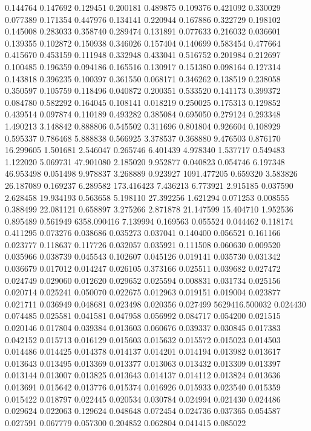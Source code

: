 0.144764
0.147692
0.129451
0.200181
0.489875
0.109376
0.421092
0.330029
0.077389
0.171354
0.447976
0.134141
0.220944
0.167886
0.322729
0.198102
0.145008
0.283033
0.358740
0.289474
0.131891
0.077633
0.216032
0.036601
0.139355
0.102872
0.150938
0.346026
0.157404
0.140699
0.583454
0.477664
0.415670
0.453159
0.111948
0.332948
0.433041
0.516752
0.201984
0.212697
0.100485
0.196359
0.094186
0.165516
0.130917
0.151380
0.098164
0.127314
0.143818
0.396235
0.100397
0.361550
0.068171
0.346262
0.138519
0.238058
0.350597
0.105759
0.118496
0.040872
0.200351
0.533520
0.141173
0.399372
0.084780
0.582292
0.164045
0.108141
0.018219
0.250025
0.175313
0.129852
0.439514
0.097874
0.110189
0.493282
0.385084
0.695050
0.279124
0.293348
1.490213
3.148842
0.888806
0.545502
0.311696
0.801804
0.926604
0.108929
0.595337
0.786468
5.888838
0.566925
3.378537
0.368880
9.476503
0.876170
16.299605
1.501681
2.546047
0.265746
6.401439
4.978340
1.537717
0.549483
1.122020
5.069731
47.901080
2.185020
9.952877
0.040823
0.054746
6.197348
46.953498
0.051498
9.978837
3.268889
0.923927
1091.477205
0.659320
3.583826
26.187089
0.169237
6.289582
173.416423
7.436213
6.773921
2.915185
0.037590
2.628458
19.934193
0.563658
5.198110
27.392256
1.621294
0.071253
0.008555
0.388499
22.081121
0.658897
3.275266
2.871878
21.147599
15.404710
1.952536
0.895489
0.561949
6358.090416
7.139994
0.169563
0.055524
0.044462
0.118174
0.411295
0.073276
0.038686
0.035273
0.037041
0.140400
0.056521
0.161166
0.023777
0.118637
0.117726
0.032057
0.035921
0.111508
0.060630
0.009520
0.035966
0.038739
0.045543
0.102607
0.045126
0.019141
0.035730
0.031342
0.036679
0.017012
0.014247
0.026105
0.373166
0.025511
0.039682
0.027472
0.024749
0.029060
0.012620
0.029652
0.025594
0.008831
0.031734
0.025156
0.020714
0.025241
0.050070
0.022675
0.012963
0.019151
0.019004
0.023877
0.021711
0.036949
0.048681
0.023498
0.020356
0.027499
5629416.500032
0.024430
0.074485
0.025581
0.041581
0.047958
0.056992
0.084717
0.054200
0.021515
0.020146
0.017804
0.039384
0.013603
0.060676
0.039337
0.030845
0.017383
0.042152
0.015713
0.016129
0.015603
0.015632
0.015572
0.015023
0.014503
0.014486
0.014425
0.014378
0.014137
0.014201
0.014194
0.013982
0.013617
0.013643
0.013495
0.013369
0.013377
0.013063
0.013432
0.013309
0.013397
0.013144
0.013007
0.013825
0.013643
0.014137
0.014112
0.013824
0.013636
0.013691
0.015642
0.013776
0.015374
0.016926
0.015933
0.023540
0.015359
0.015422
0.018797
0.022445
0.020534
0.030784
0.024994
0.021430
0.024486
0.029624
0.022063
0.129624
0.048648
0.072454
0.024736
0.037365
0.054587
0.027591
0.067779
0.057300
0.204852
0.062804
0.041415
0.085022
